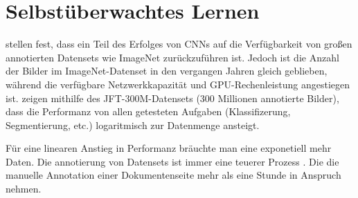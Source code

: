 \chapter{Selbstüberwachtes Lernen}
\label{chap:selfsupervised}
\citeauthor*{SunRevisitingUnreasonableEffectiveness2017} stellen fest, dass ein Teil des Erfolges von CNNs auf
die Verfügbarkeit von großen annotierten Datensets wie ImageNet zurückzuführen ist. 
Jedoch ist die Anzahl der Bilder im ImageNet-Datenset in den vergangen Jahren gleich geblieben, während die  verfügbare Netzwerkkapazität und GPU-Rechenleistung angestiegen ist.
\citeauthor{SunRevisitingUnreasonableEffectiveness2017} zeigen mithilfe des JFT-300M-Datensets (300 Millionen annotierte Bilder), dass die Performanz von allen getesteten Aufgaben (Klassifizerung, Segmentierung, etc.)
logaritmisch zur Datenmenge ansteigt. 

Für eine linearen Anstieg in Performanz bräuchte man eine exponetiell mehr Daten.
Die annotierung von Datensets ist immer eine teuerer Prozess \autocite[988]{ValvenyDatasetsAnnotationsDocument2014}.
Die die manuelle Annotation einer Dokumentenseite mehr als eine Stunde in Anspruch nehmen. 

